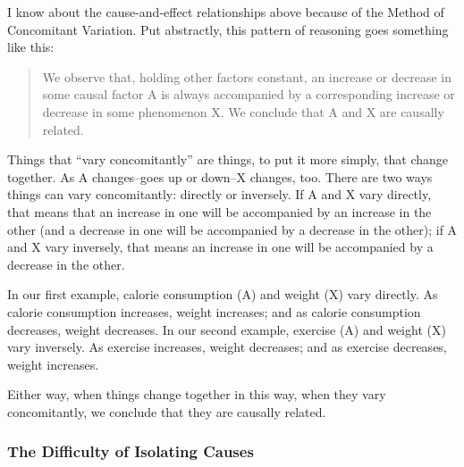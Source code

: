 I know about the cause-and-effect relationships above because of the Method of Concomitant
Variation. Put abstractly, this pattern of reasoning goes something like this:

\begin{quote}
We observe that, holding other factors constant, an increase or decrease in some causal
factor A is always accompanied by a corresponding increase or decrease in some
phenomenon X. We conclude that A and X are causally related.
\end{quote}

Things that ``vary concomitantly'' are things, to put it more simply, that change together. As A
changes--goes up or down--X changes, too. There are two ways things can vary concomitantly:
directly or inversely. If A and X vary directly, that means that an increase in one will be
accompanied by an increase in the other (and a decrease in one will be accompanied by a decrease
in the other); if A and X vary inversely, that means an increase in one will be accompanied by a
decrease in the other.

In our first example, calorie consumption (A) and weight (X) vary directly. As calorie consumption
increases, weight increases; and as calorie consumption decreases, weight decreases. In our second
example, exercise (A) and weight (X) vary inversely. As exercise increases, weight decreases; and
as exercise decreases, weight increases.

Either way, when things change together in this way, when they vary concomitantly, we conclude
that they are causally related.

\subsubsection{The Difficulty of Isolating Causes}

